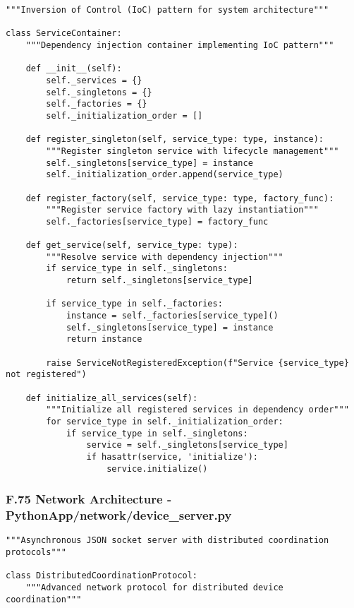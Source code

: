 \documentclass[12pt,a4paper]{article}
\begin{document}
{{\begin{verbatim}
"""Inversion of Control (IoC) pattern for system architecture"""

class ServiceContainer:
    """Dependency injection container implementing IoC pattern"""
    
    def __init__(self):
        self._services = {}
        self._singletons = {}
        self._factories = {}
        self._initialization_order = []
    
    def register_singleton(self, service_type: type, instance):
        """Register singleton service with lifecycle management"""
        self._singletons[service_type] = instance
        self._initialization_order.append(service_type)
    
    def register_factory(self, service_type: type, factory_func):
        """Register service factory with lazy instantiation"""
        self._factories[service_type] = factory_func
    
    def get_service(self, service_type: type):
        """Resolve service with dependency injection"""
        if service_type in self._singletons:
            return self._singletons[service_type]
        
        if service_type in self._factories:
            instance = self._factories[service_type]()
            self._singletons[service_type] = instance
            return instance
        
        raise ServiceNotRegisteredException(f"Service {service_type} not registered")
    
    def initialize_all_services(self):
        """Initialize all registered services in dependency order"""
        for service_type in self._initialization_order:
            if service_type in self._singletons:
                service = self._singletons[service_type]
                if hasattr(service, 'initialize'):
                    service.initialize()
\end{verbatim}

\subsubsection{F.75 Network Architecture - PythonApp/network/device_server.py}

\begin{verbatim}
"""Asynchronous JSON socket server with distributed coordination protocols"""

class DistributedCoordinationProtocol:
    """Advanced network protocol for distributed device coordination"""
    

\end{verbatim}}}
\end{document}
